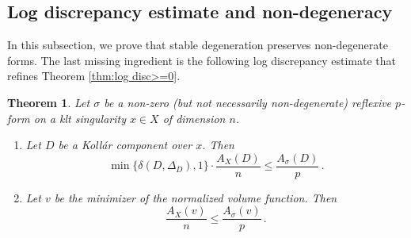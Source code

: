 \documentclass[12pt]{amsart}
\newtheorem{thm}[prop]{Theorem}
\theoremstyle{definition}
\numberwithin{equation}{section}
\begin{document}
\subsection{Log discrepancy estimate and non-degeneracy}

In this subsection, we prove that stable degeneration preserves non-degenerate forms. The last missing ingredient is the following log discrepancy estimate that refines Theorem \ref{thm:log disc>=0}.

\begin{thm}\label{thm:estimate dis}
Let $\sigma$ be a non-zero (but not necessarily non-degenerate) reflexive $p$-form on a klt singularity $x\in X$ of dimension $n$.
\begin{enumerate}
\item Let $D$ be a Koll\'ar component over $x$. Then
\[
\min\{\delta(D,\Delta_D),1\} \cdot \frac{A_X(D)}{n}\le \frac{A_{\sigma}(D)}{p} \, .
\]
\item Let $v$ be the minimizer of the normalized volume function. Then 
\[
\frac{A_X(v)}{n}\le \frac{A_{\sigma}(v)}{p} \, .
\] 
\end{enumerate}
\end{thm}
\end{document}
